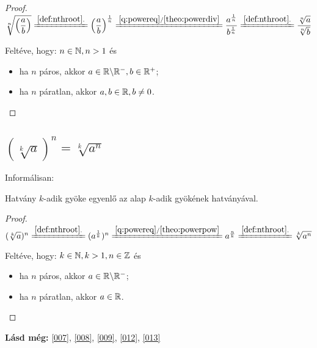 \begin{proof}

$ \sqrt[n]{\Big(\dfrac{a}{b}\Big)} 
 \xlongequal{\ref{def:nthroot}.}
  \Big(\dfrac{a}{b}\Big)^{\frac{1}{n}}
 \xlongequal{\ref{q:powereq}/\ref{theo:powerdiv}}
  \dfrac{a^{\frac{1}{n}}}{b^{\frac{1}{n}}}
 \xlongequal{\ref{def:nthroot}.}
  \dfrac{\sqrt[n]{a}}{\sqrt[n]{b}}
$

Feltéve, hogy: $n \in \mathbb{N}, n >1$ és
\begin{itemize}
  \item ha $n$ páros, akkor $a \in \mathbb{R} \backslash \mathbb{R}^-, b \in \mathbb{R}^+$;
  \item ha $n$ páratlan, akkor $a, b \in \mathbb{R}, b \neq 0$.
\end{itemize}
\end{proof}
	
\subsection{
\texorpdfstring
  {$(\sqrt[k]{a})^n = \sqrt[k]{a^n}$}
  {(a**(1/k))**n = (a**n)**(1/k)}
}
Informálisan:

Hatvány $k$-adik gyöke egyenlő az alap $k$-adik gyökének hatványával.

\begin{proof}

$ (\sqrt[k]{a})^n 
 \xlongequal{\ref{def:nthroot}.}
  (a^{\frac{1}{k}})^n
 \xlongequal{\ref{q:powereq}/\ref{theo:powerpow}}
  a^{\frac{n}{k}}
 \xlongequal{\ref{def:nthroot}.}
  \sqrt[k]{a^n}
$

Feltéve, hogy: $k \in \mathbb{N}, k >1, n \in \mathbb{Z}$ és
\begin{itemize}
  \item ha $n$ páros, akkor $a \in \mathbb{R} \backslash \mathbb{R}^-$;
  \item ha $n$ páratlan, akkor $a \in \mathbb{R}$.
\end{itemize}
\end{proof}
	
\textbf{Lásd még:} \ref{007}, \ref{008}, \ref{009}, \ref{012}, \ref{013}
